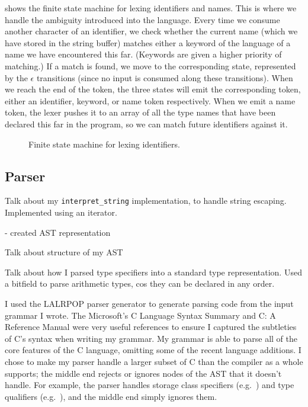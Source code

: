 \documentclass[00-main.tex]{subfiles}
\begin{document}
 shows the finite state machine for lexing identifiers and  names.
This is where we handle the ambiguity introduced into the language.
  Every time we consume another character of an identifier, we check whether the current name (which we have stored in the string buffer) matches either a keyword of the language of a  name we have encountered this far.
(Keywords are given a higher priority of matching.)
  If a match is found, we move to the corresponding state, represented by the $\epsilon$ transitions (since no input is consumed along these transitions).
When we reach the end of the token, the three states will emit the corresponding token, either an identifier, keyword, or  name token respectively.
When we emit a  name token, the lexer pushes it to an array of all the type names that have been declared this far in the program, so we can match future identifiers against it.

\begin{figure}[ht]
  \centering
  \caption{Finite state machine for lexing identifiers.}
  \label{fig:lexing identifiers fsm}
\end{figure}


\subsection{Parser}

\begin{mrwComment}
Talk about my \texttt{interpret\_string} implementation, to handle string escaping. Implemented using an iterator.

- created AST representation

Talk about structure of my AST

Talk about how I parsed type specifiers into a standard type representation. Used a bitfield to parse arithmetic types, cos they can be declared in any order.
\end{mrwComment}

I used the LALRPOP parser generator  to generate parsing code from the input grammar I wrote.
The Microsoft's C Language Syntax Summary  and C: A Reference Manual  were very useful references to ensure I captured the subtleties of C's syntax when writing my grammar.
My grammar is able to parse all of the core features of the C language, omitting some of the recent language additions. I chose to make my parser handle a larger subset of C than the compiler as a whole supports; the middle end rejects or ignores nodes of the AST that it doesn't handle. For example, the parser handles storage class specifiers (e.g.\ ) and type qualifiers (e.g.\ ), and the middle end simply ignores them.
\end{document}
